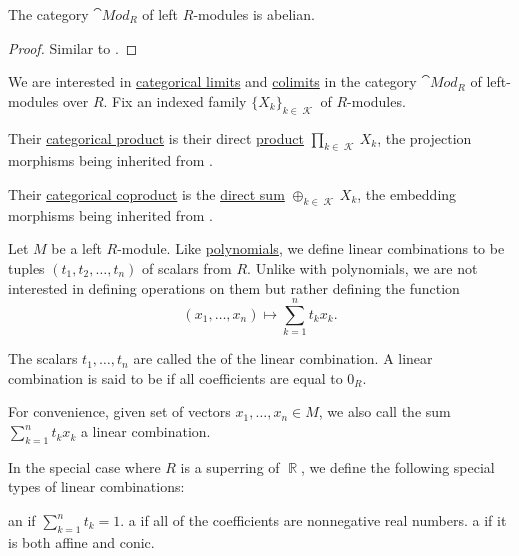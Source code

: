 \begin{proposition}\label{thm:mod_r_is_abelian}
  The category \( \cat{Mod}_R \) of left \( R \)-modules is abelian.
\end{proposition}
\begin{proof}
  Similar to .
\end{proof}

\begin{proposition}\label{thm:module_categorical_limits}
  We are interested in \hyperref[def:categorical_limit]{categorical limits} and \hyperref[def:categorical_colimit]{colimits} in the category \( \cat{Mod}_R \) of left-modules over \( R \). Fix an indexed family  \( \{ X_k \}_{k \in \mscrK} \) of \( R \)-modules.
  \begin{thmenum}
     Their \hyperref[def:categorical_product]{categorical product} is their direct \hyperref[def:left_module_direct_product]{product} \( \prod_{k \in \mscrK} X_k \), the projection morphisms being inherited from .

     Their \hyperref[def:categorical_coproduct]{categorical coproduct} is the \hyperref[def:group_direct_product]{direct sum} \( \oplus_{k \in \mscrK} X_k \), the embedding morphisms being inherited from .
  \end{thmenum}
\end{proposition}

\begin{definition}\label{def:linear_combination}
  Let \( M \) be a left \( R \)-module. Like \hyperref[def:polynomial]{polynomials}, we define linear combinations to be tuples \( (t_1, t_2, \ldots, t_n) \) of scalars from \( R \). Unlike with polynomials, we are not interested in defining operations on them but rather defining the function
  \begin{equation}\label{def:linear_combination/function}
    (x_1, \ldots, x_n) \mapsto \sum_{k=1}^n t_k x_k.
  \end{equation}

  The scalars \( t_1, \ldots, t_n \) are called the  of the linear combination. A linear combination is said to be  if all coefficients are equal to \( 0_R \).

  For convenience, given set of vectors \( x_1, \ldots, x_n \in M \), we also call the sum \( \sum_{k=1}^n t_k x_k \) a linear combination.

  In the special case where \( R \) is a superring of \( \BbbR \), we define the following special types of linear combinations:
  \begin{thmenum}
     an  if \( \sum_{k=1}^n t_k = 1 \).
     a  if all of the coefficients are nonnegative real numbers.
     a  if it is both affine and conic.
  \end{thmenum}
\end{definition}

